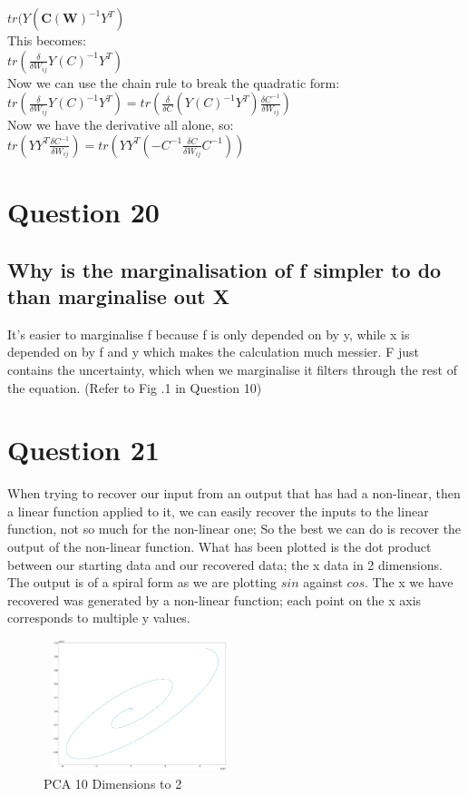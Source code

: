 \documentclass[a4paper, 9pt]{article}
\begin{document}
\( tr(Y (\mathbf{C}(\mathbf{W})^{-1}Y^T) \) \\
\newline
This becomes: \\

\( tr(\frac{\delta}{\delta W_{ij}} Y(C)^{-1}Y^T) \) \\
\newline
Now we can use the chain rule to break the quadratic form: \\

\( tr(\frac{\delta}{\delta W_{ij}} Y(C)^{-1}Y^T) = tr(\frac{\delta}{\delta C} (Y(C)^{-1}Y^T) \frac{\delta C^{-1}}{\delta W_{ij}} ) \) \\
\newline
Now we have the derivative all alone, so: \\ 

\( tr(Y Y^T \frac{\delta C^{-1}}{\delta W_{ij}}) = tr(Y Y^T ( -C^{-1} \frac{\delta C}{\delta W_{ij}} C^{-1})) \)

\section*{Question 20}
\subsection*{Why is the marginalisation of f simpler to do than marginalise out X}
It's easier to marginalise f because f is only depended on by y, while x is depended on by f and y which makes the calculation much messier. F just contains the uncertainty, which when we marginalise it filters through the rest of the equation. (Refer to Fig .1 in Question 10)

\section*{Question 21}
When trying to recover our input from an output that has had a non-linear, then a linear function applied to it, we can easily recover the inputs to the linear function, not so much for the non-linear one; So the best we can do is recover the output of the non-linear function. What has been plotted is the dot product between our starting data and our recovered data; the x data in 2 dimensions.\\
The output is of a spiral form as we are plotting \(sin\) against \(cos\). The x we have recovered was generated by a non-linear function; each point on the x axis corresponds to multiple y values.
\begin{figure}[H]
\begin{center}
\includegraphics[width=2.2in,height=1.5in]{spiral}
\end{center}
\caption{PCA 10 Dimensions to 2}
\end{figure}
\end{document}

